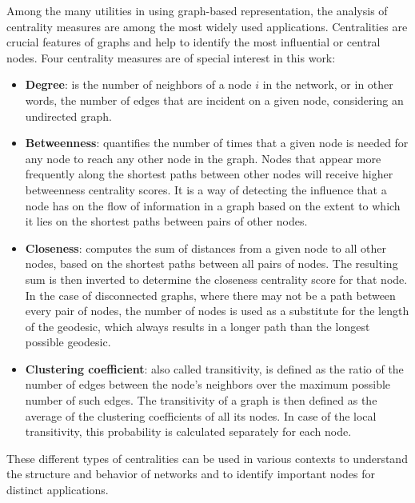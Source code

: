 Among the many utilities in using graph-based representation, the analysis of centrality measures are among the most widely used applications. Centralities are crucial features of graphs and help to identify the most influential or central nodes. Four centrality measures are of special interest in this work:

\begin{itemize}
  
    \item \textbf{Degree}: is the number of neighbors of a node $i$ in the network, or in other words, the number of edges that are incident on a given node, considering an undirected graph.

    \item \textbf{Betweenness}: quantifies the number of times that a given node is needed for any node to reach any other node in the graph. Nodes that appear more frequently along the shortest paths between other nodes will receive higher betweenness centrality scores. It is a way of detecting the influence that a node has on the flow of information in a graph based on the extent to which it lies on the shortest paths between pairs of other nodes.

    \item \textbf{Closeness}: computes the sum of distances from a given node to all other nodes, based on the shortest paths between all pairs of nodes. The resulting sum is then inverted to determine the closeness centrality score for that node. In the case of disconnected graphs, where there may not be a path between every pair of nodes, the number of nodes is used as a substitute for the length of the geodesic, which always results in a longer path than the longest possible geodesic. 

    \item \textbf{Clustering coefficient}: also called transitivity, is defined as the ratio of the number of edges between the node's neighbors over the maximum possible number of such edges. The transitivity of a graph is then defined as the average of the clustering coefficients of all its nodes. In case of the local transitivity, this probability is calculated separately for each node. 
\end{itemize}




These different types of centralities can be used in various contexts to understand the structure and behavior of networks and to identify important nodes for distinct applications.





